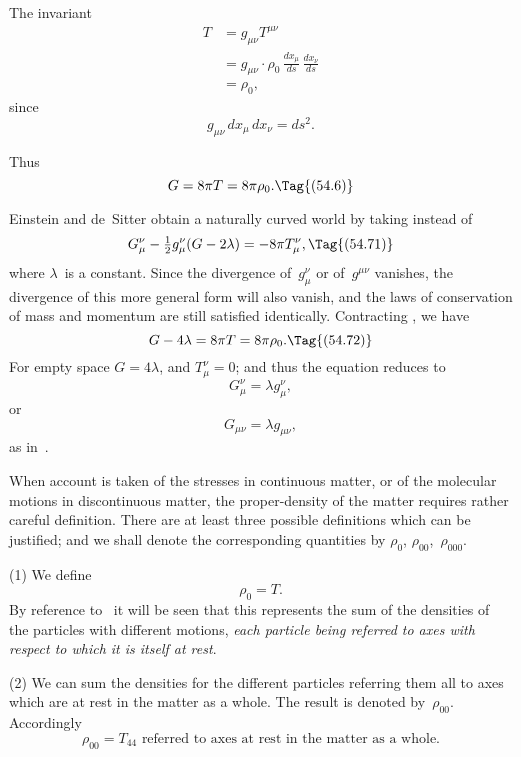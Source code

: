 \documentclass[12pt]{book}
\begin{document}
The invariant
\begin{align*}
  T &= g_{\mu\nu} T^{\mu\nu} \\
  &= g_{\mu\nu} \cdot \rho_{0}\, \frac{dx_{\mu}}{ds}\, \frac{dx_{\nu}}{ds} \\
  &= \rho_{0},
\end{align*}
since
\[
g_{\mu\nu}\, dx_{\mu}\, dx_{\nu} = ds^{2}.
\]

Thus
\[
G = 8\pi T = 8\pi \rho_{0}.
\Tag{(54.6)}
\]

Einstein and de~Sitter obtain a naturally curved world by taking instead
of~
\[
G_{\mu}^{\nu} - \tfrac{1}{2}g_{\mu}^{\nu}(G - 2\lambda) = -8\pi T_{\mu}^{\nu},
\Tag{(54.71)}
\]
where $\lambda$~is a constant. Since the divergence of~$g_{\mu}^{\nu}$ or of~$g^{\mu\nu}$ vanishes, the
divergence of this more general form will also vanish, and the laws of conservation
of mass and momentum are still satisfied identically. Contracting
, we have
\[
G - 4\lambda = 8\pi T = 8\pi \rho_{0}.
\Tag{(54.72)}
\]
For empty space $G = 4\lambda$, and $T_{\mu}^{\nu} = 0$; and thus the equation reduces to
\[
G_{\mu}^{\nu} = \lambda g_{\mu}^{\nu},
\]
or
\[
G_{\mu\nu} = \lambda g_{\mu\nu},
\]
as in~.

When account is taken of the stresses in continuous matter, or of the
%
molecular motions in discontinuous matter, the proper-density of the matter
%
requires rather careful definition. There are at least three possible definitions
which can be justified; and we shall denote the corresponding quantities by
$\rho_{0}$, $\rho_{00}$,~$\rho_{000}$.

(1) We define
\[
\rho_{0} = T.
\]
By reference to~ it will be seen that this represents the sum of the
densities of the particles with different motions, \emph{each particle being referred
to axes with respect to which it is itself at rest}.

(2) We can sum the densities for the different particles referring them
all to axes which are at rest in the matter as a whole. The result is denoted
by~$\rho_{00}$. Accordingly
\[
\text{$\rho_{00} = T_{44}$ referred to axes at rest in the matter as a whole.}
\]
\end{document}
